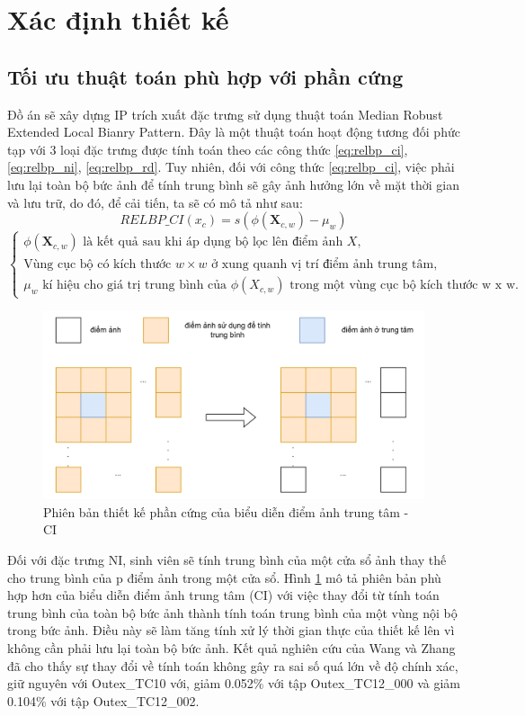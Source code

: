 \section{Xác định thiết kế}
\subsection{Tối ưu thuật toán phù hợp với phần cứng}
Đồ án sẽ xây dựng IP trích xuất đặc trưng sử dụng thuật toán Median Robust Extended Local Bianry Pattern. Đây là một thuật toán hoạt động tương đối phức tạp với 3 loại đặc trưng được tính toán theo các công thức \ref{eq:relbp_ci}, \ref{eq:relbp_ni}, \ref{eq:relbp_rd}. Tuy nhiên, đối với công thức \ref{eq:relbp_ci}, việc phải lưu lại toàn bộ bức ảnh để tính trung bình sẽ gây ảnh hưởng lớn về mặt thời gian và lưu trữ, do đó, để cải tiến, ta sẽ có mô tả như sau:
    \begin{equation}
        RELBP\_CI(x_c) = s(\phi(\mathbf{X}_{c, w}) - \mu_w)
         \label{eq:relbp_ci_op}
    \end{equation}
    $\begin{cases}
    \phi(\mathbf{X}_{c,w}) \text{ là kết quả sau khi áp dụng bộ lọc lên điểm ảnh } X, \\
    \text{Vùng cục bộ có kích thước } w \times w \text{ ở xung quanh vị trí điểm ảnh trung tâm}, \\
    \mu_w \text{ kí hiệu cho giá trị trung bình của } \phi(X_{c,w}) \text{ trong một vùng cục bộ kích thước w x w}.
\end{cases}$

\begin{figure} [!hht]
	\centering
	\includegraphics[width=\linewidth]{figures/ciOptimize.png}
	\caption{Phiên bản thiết kế phần cứng của biểu diễn điểm ảnh trung tâm - CI}
	\label{fig:ciOptimize}
\end{figure} 

Đối với đặc trưng NI, sinh viên sẽ tính trung bình của một cửa sổ ảnh thay thế cho trung bình của p điểm ảnh trong một cửa sổ. Hình \ref{fig:ciOptimize} mô tả phiên bản phù hợp hơn của biểu diễn điểm ảnh trung tâm (CI) với việc thay đổi từ tính toán trung bình của toàn bộ bức ảnh thành tính toán trung bình của một vùng nội bộ trong bức ảnh. Điều này sẽ làm tăng tính xử lý thời gian thực của thiết kế lên vì không cần phải lưu lại toàn bộ bức ảnh. Kết quả nghiên cứu của Wang và Zhang \cite{realTimeTexture} đã cho thấy sự thay đổi về tính toán không gây ra sai số quá lớn về độ chính xác, giữ nguyên với Outex\_TC10 với, giảm 0.052\% với tập Outex\_TC12\_000 và giảm 0.104\% với tập Outex\_TC12\_002.

